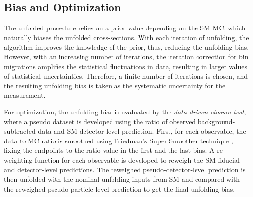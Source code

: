 \subsection{Bias and Optimization}
\label{subsec:Bias}

The unfolded procedure relies on a prior value depending on the SM MC, which naturally biases the unfolded cross-sections. With each iteration of unfolding, the algorithm improves the knowledge of the prior, thus, reducing the unfolding bias. However, with an increasing number of iterations, the iteration correction for bin migrations amplifies the statistical fluctuations in data, resulting in larger values of statistical uncertainties. Therefore, a finite number of iterations is chosen, and the resulting unfolding bias is taken as the systematic uncertainty for the measurement. 

For optimization, the unfolding bias is evaluated by the \textit{data-driven closure test}, where a pseudo dataset is developed using the ratio of observed background-subtracted data and SM detector-level prediction. First, for each observable, the data to MC ratio is smoothed using Friedman's Super Smoother technique \cite{FriedmanSmoother}, fixing the endpoints to the ratio value in the first and the last bins. A re-weighting function for each observable is developed to reweigh the SM fiducial- and detector-level predictions. The reweighed pseudo-detector-level prediction is then unfolded with the nominal unfolding inputs from SM and compared with the reweighed pseudo-particle-level prediction to get the final unfolding bias.

